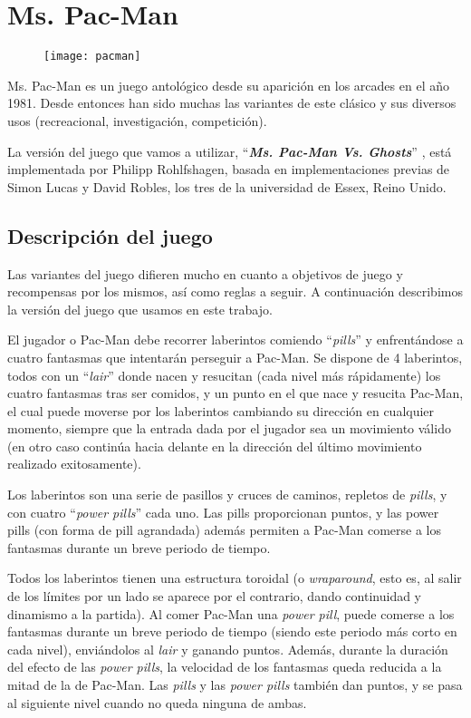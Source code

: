 \chapter{Ms. Pac-Man}
\begin{figure}[H]
\centering
\texttt{[image: pacman]}
\end{figure}

Ms. Pac-Man es un juego antológico desde su aparición en los arcades en el año 1981. Desde entonces han sido muchas las variantes de este clásico y sus diversos usos (recreacional, investigación, competición).
 
La versión del juego que vamos a utilizar, ``\textbf{\textit{Ms. Pac-Man Vs. Ghosts}}'' \cite{pacmanvsghostsTournamentPage} \cite{pacmanvsghostsGit}, está implementada por Philipp Rohlfshagen, basada en implementaciones previas de Simon Lucas y David Robles, los tres de la universidad de Essex, Reino Unido.


\section{Descripción del juego}
Las variantes del juego difieren mucho en cuanto a objetivos de juego y recompensas por los mismos, así como reglas a seguir. A continuación describimos la versión del juego que usamos en este trabajo.

El jugador o Pac-Man debe recorrer laberintos comiendo ``\textit{pills}'' y enfrentándose a cuatro fantasmas que intentarán perseguir a Pac-Man. Se dispone de 4 laberintos, todos con un ``\textit{lair}'' donde nacen y resucitan (cada nivel más rápidamente) los cuatro fantasmas tras ser comidos, y un punto en el que nace y resucita Pac-Man, el cual puede moverse por los laberintos cambiando su dirección en cualquier momento, siempre que la entrada dada por el jugador sea un movimiento válido (en otro caso continúa hacia delante en la dirección del último movimiento realizado exitosamente).
 
\blankline

Los laberintos son una serie de pasillos y cruces de caminos, repletos de \textit{pills}, y con cuatro ``\textit{power pills}'' cada uno. Las pills proporcionan puntos, y las power pills (con forma de pill agrandada) además permiten a Pac-Man comerse a los fantasmas durante un breve periodo de tiempo.

Todos los laberintos tienen una estructura toroidal (o \textit{wraparound}, esto es, al salir de los límites por un lado se aparece por el contrario, dando continuidad y dinamismo a la partida). Al comer Pac-Man una \textit{power pill}, puede comerse a los fantasmas durante un breve periodo de tiempo (siendo este periodo más corto en cada nivel), enviándolos al \textit{lair} y ganando puntos. Además, durante la duración del efecto de las \textit{power pills}, la velocidad de los fantasmas queda reducida a la mitad de la de Pac-Man. Las \textit{pills} y las \textit{power pills} también dan puntos, y se pasa al siguiente nivel cuando no queda ninguna de ambas.
 
